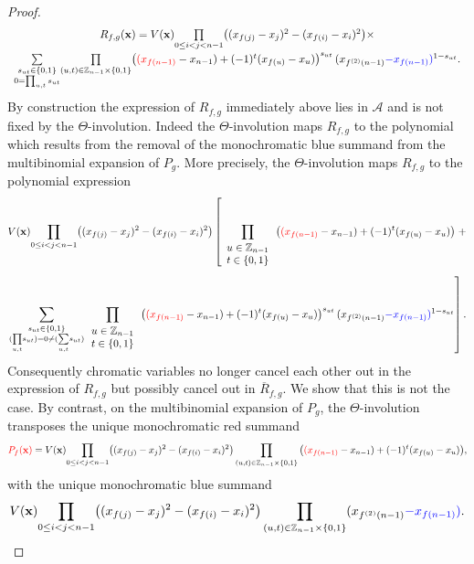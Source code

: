 \begin{proof}
\[\begin{array}{c}
R_{f,g}(\mathbf{x})=V(\mathbf{x})\underset{0\le i<j<n-1}{\prod}\big((x_{f(j)}-x_{j})^{2}-(x_{f(i)}-x_{i})^{2}\big)\times\\[10pt]
\underset{\substack{s_{ut}\in\{0,1\}\\
0=\prod_{u,t}s_{ut}
}
}{\sum}\underset{(u,t)\in\mathbb{Z}_{n-1}\times\{0,1\}}{\prod}\big({\color{red}(x_{f(n-1)}}-x_{n-1})+(-1)^{t}(x_{f(u)}-x_{u})\big)^{s_{ut}}\,(x_{f^{(2)}(n-1)}{\color{blue}-x_{f(n-1)}}{\color{blue})}^{1-s_{ut}}.\\[10pt]
\end{array}
\]
By construction the expression of $R_{f,g}$ immediately above lies in $\mathcal{A}$ and is not fixed by the $\Theta$-involution. Indeed the $\Theta$-involution maps $R_{f,g}$ to the polynomial which results from the removal of the monochromatic blue summand from the multibinomial expansion of $P_{g}$. More precisely, the $\Theta$-involution maps $R_{f,g}$ to the polynomial expression
\[
V(\mathbf{x})\underset{0\le i<j<n-1}{\prod}\big((x_{f(j)}-x_{j})^{2}-(x_{f(i)}-x_{i})^{2}\big)\left[\prod_{\begin{array}{c}
u\in\mathbb{Z}_{n-1}\\
t\in\{0,1\}
\end{array}}\big({\color{red}(x_{f(n-1)}}-x_{n-1})+(-1)^{t}(x_{f(u)}-x_{u})\big)\right.+
\]
\[
\left.\sum_{\substack{s_{ut}\in\{0,1\}\\
(\underset{u,t}{\prod}s_{ut})=0\ne(\underset{u,t}{\sum}s_{ut})
}
}\prod_{\begin{array}{c}
u\in\mathbb{Z}_{n-1}\\
t\in\{0,1\}
\end{array}}\big({\color{red}(x_{f(n-1)}}-x_{n-1})+(-1)^{t}(x_{f(u)}-x_{u})\big)^{s_{ut}}\,(x_{f^{(2)}(n-1)}{\color{blue}-x_{f(n-1)}}{\color{blue})}^{1-s_{ut}}\right].
\]
Consequently chromatic variables no longer cancel each other out in the expression of $R_{f,g}$ but possibly cancel out in $\overline{R}_{f,g}$. We show that this is not the case.
By contrast, on the multibinomial expansion of $P_{g}$, the $\Theta$-involution transposes the unique monochromatic red summand
\[
{\color{red}P_{f}(\mathbf{x})}=V(\mathbf{x})\underset{0\le i<j<n-1}{\prod}\big((x_{f(j)}-x_{j})^{2}-(x_{f(i)}-x_{i})^{2}\big)\prod_{(u,t)\in\mathbb{Z}_{n-1}\times\{0,1\}}\big({\color{red}(x_{f(n-1)}}-x_{n-1})+(-1)^{t}(x_{f(u)}-x_{u})\big),
\]
with the unique monochromatic blue summand
\[
V(\mathbf{x})\underset{0\le i<j<n-1}{\prod}\big((x_{f(j)}-x_{j})^{2}-(x_{f(i)}-x_{i})^{2}\big)\prod_{(u,t)\in\mathbb{Z}_{n-1}\times\{0,1\}}(x_{f^{(2)}(n-1)}{\color{blue}-x_{f(n-1)}}{\color{blue})}.
\]
\end{proof}
